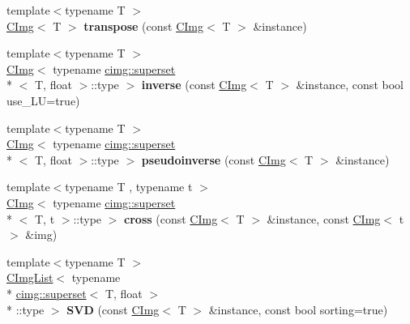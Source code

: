 \begin{DoxyCompactItemize}
\item 
\hypertarget{namespacecimg__library_ace4f451db6ce41f6cfa8bcc0e0b1ac00}{{\footnotesize template$<$typename T $>$ }\\\hyperlink{structcimg__library_1_1_c_img}{C\-Img}$<$ T $>$ {\bfseries transpose} (const \hyperlink{structcimg__library_1_1_c_img}{C\-Img}$<$ T $>$ \&instance)}\label{namespacecimg__library_ace4f451db6ce41f6cfa8bcc0e0b1ac00}

\item 
\hypertarget{namespacecimg__library_af7974a0baf2e86be676b28051673d51d}{{\footnotesize template$<$typename T $>$ }\\\hyperlink{structcimg__library_1_1_c_img}{C\-Img}$<$ typename \hyperlink{structcimg__library_1_1cimg_1_1superset}{cimg\-::superset}\\*
$<$ T, float $>$\-::type $>$ {\bfseries inverse} (const \hyperlink{structcimg__library_1_1_c_img}{C\-Img}$<$ T $>$ \&instance, const bool use\-\_\-\-L\-U=true)}\label{namespacecimg__library_af7974a0baf2e86be676b28051673d51d}

\item 
\hypertarget{namespacecimg__library_ac51bcf31ac7193452292b7d0387e80d4}{{\footnotesize template$<$typename T $>$ }\\\hyperlink{structcimg__library_1_1_c_img}{C\-Img}$<$ typename \hyperlink{structcimg__library_1_1cimg_1_1superset}{cimg\-::superset}\\*
$<$ T, float $>$\-::type $>$ {\bfseries pseudoinverse} (const \hyperlink{structcimg__library_1_1_c_img}{C\-Img}$<$ T $>$ \&instance)}\label{namespacecimg__library_ac51bcf31ac7193452292b7d0387e80d4}

\item 
\hypertarget{namespacecimg__library_a88cff17d038d3f56b9f5ea13fe6440b9}{{\footnotesize template$<$typename T , typename t $>$ }\\\hyperlink{structcimg__library_1_1_c_img}{C\-Img}$<$ typename \hyperlink{structcimg__library_1_1cimg_1_1superset}{cimg\-::superset}\\*
$<$ T, t $>$\-::type $>$ {\bfseries cross} (const \hyperlink{structcimg__library_1_1_c_img}{C\-Img}$<$ T $>$ \&instance, const \hyperlink{structcimg__library_1_1_c_img}{C\-Img}$<$ t $>$ \&img)}\label{namespacecimg__library_a88cff17d038d3f56b9f5ea13fe6440b9}

\item 
\hypertarget{namespacecimg__library_add7d9ff588debeb2da0c6ed19c86156a}{{\footnotesize template$<$typename T $>$ }\\\hyperlink{structcimg__library_1_1_c_img_list}{C\-Img\-List}$<$ typename \\*
\hyperlink{structcimg__library_1_1cimg_1_1superset}{cimg\-::superset}$<$ T, float $>$\\*
\-::type $>$ {\bfseries S\-V\-D} (const \hyperlink{structcimg__library_1_1_c_img}{C\-Img}$<$ T $>$ \&instance, const bool sorting=true)}\label{namespacecimg__library_add7d9ff588debeb2da0c6ed19c86156a}


\end{DoxyCompactItemize}
